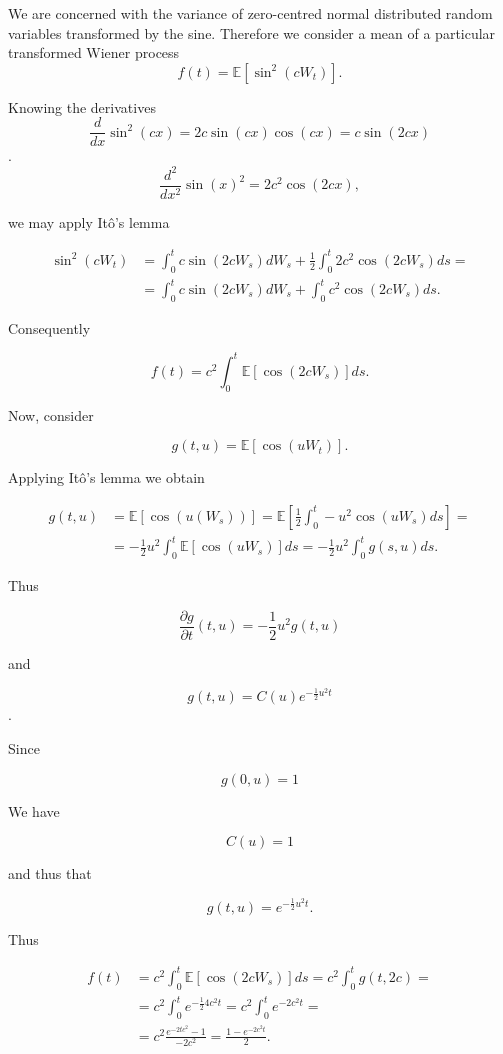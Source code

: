 \documentclass{letter}
\begin{document}
We are concerned with the variance of zero-centred normal distributed random variables transformed by the sine. Therefore we consider a mean of a particular transformed Wiener process $$f(t)=\mathbb{E}\left[\sin^2(cW_t)\right].$$

Knowing the derivatives  $$\frac{d}{dx}\sin^2(cx)=2c\sin(cx)\cos(cx)=c\sin(2cx)$$. $$\frac{d^2}{dx^2}\sin(x)^2 = 2c^2\cos(2cx),$$

we may apply Itô's lemma

\begin{equation*}
\begin{split}
\sin^2(cW_t) &= \int_0^t c\sin(2cW_s)dW_s + \frac{1}{2}\int_0^t 2c^2\cos(2cW_s)ds =\\
&=\int_0^t c\sin(2cW_s)dW_s + \int_0^t c^2\cos(2cW_s)ds.
\end{split}
\end{equation*}

Consequently

$$f(t)=c^2\int_0^t\mathbb{E}\left[\cos(2cW_s)\right]ds.$$

Now, consider

$$g(t,u)=\mathbb{E}\left[\cos(uW_t)\right].$$

Applying Itô's lemma we obtain

\begin{equation*}
\begin{split}
g(t,u)&=\mathbb{E}\left[\cos(u(W_s))\right]=\mathbb{E}\left[\frac{1}{2}\int_0^t-u^2\cos(uW_s)ds\right]=\\
&=-\frac{1}{2}u^2\int_0^t\mathbb{E}\left[\cos(uW_s)\right]ds=-\frac{1}{2}u^2 \int_0^tg(s,u)ds.
\end{split}
\end{equation*}

Thus

$$\frac{\partial g}{\partial t}\left(t,u\right)=-\frac{1}{2}u^2 g\left(t,u\right)$$
\newpage

and

$$g(t,u)=C(u)e^{-\frac{1}{2}u^2t}$$.

Since

$$g(0,u)=1$$

We have

$$C(u)=1$$

and thus that

$$g(t,u)=e^{-\frac{1}{2}u^2t}.$$

Thus

\begin{equation*}
\begin{split}
f(t) & =c^2\int_0^t\mathbb{E}\left[\cos(2cW_s)\right]ds=c^2\int_0^tg(t,2c)=\\
&=c^2\int_0^te^{-\frac{1}{2}4c^2t}=c^2\int_0^te^{-2c^2t}=\\
&=c^2\frac{e^{-2tc^2}-1}{-2c^2}=\frac{1-e^{-2c^2t}}{2}.
\end{split}
\end{equation*}
\end{document}
